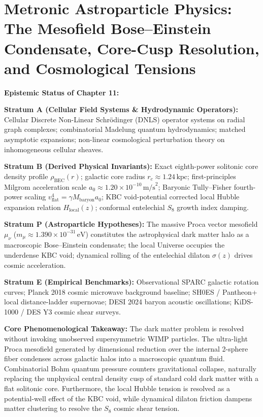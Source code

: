 \documentclass[
    12pt,
    a4paper,
    headings=normal,
    twoside=false,
    open=any,
    parskip=half
]{scrbook}
\begin{document}
\chapter{Metronic Astroparticle Physics: The Mesofield Bose--Einstein Condensate, Core-Cusp Resolution, and Cosmological Tensions}
\label{chap:ch11_expanded}

\begin{firewallbox}
\textbf{Epistemic Status of Chapter 11:}\par\smallskip\noindent
\textbf{Stratum A (Cellular Field Systems \& Hydrodynamic Operators):} Cellular Discrete Non-Linear Schrödinger (DNLS) operator systems on radial graph complexes; combinatorial Madelung quantum hydrodynamics; matched asymptotic expansions; non-linear cosmological perturbation theory on inhomogeneous cellular sheaves.\par\smallskip\noindent
\textbf{Stratum B (Derived Physical Invariants):} Exact eighth-power solitonic core density profile $\rho_{\text{BEC}}(r)$; galactic core radius $r_c \approx 1.24\,\text{kpc}$; first-principles Milgrom acceleration scale $a_0 \approx 1.20 \times 10^{-10}\,\text{m/s}^2$; Baryonic Tully--Fisher fourth-power scaling $v_{\text{flat}}^4 = \gamma M_{\text{baryon}} a_0$; KBC void-potential corrected local Hubble expansion relation $H_{\text{local}}(z)$; conformal entelechial $S_8$ growth index damping.\par\smallskip\noindent
\textbf{Stratum P (Astroparticle Hypotheses):} The massive Proca vector mesofield $\mu_\nu$ ($m_\mu \approx 1.390 \times 10^{-31}\,\text{eV}$) constitutes the astrophysical dark matter halo as a macroscopic Bose--Einstein condensate; the local Universe occupies the underdense KBC void; dynamical rolling of the entelechial dilaton $\sigma(z)$ drives cosmic acceleration.\par\smallskip\noindent
\textbf{Stratum E (Empirical Benchmarks):} Observational SPARC galactic rotation curves; Planck 2018 cosmic microwave background baseline; SH0ES / Pantheon+ local distance-ladder supernovae; DESI 2024 baryon acoustic oscillations; KiDS-1000 / DES Y3 cosmic shear surveys.\par\smallskip\noindent
\textbf{Core Phenomenological Takeaway:} The dark matter problem is resolved without invoking unobserved supersymmetric WIMP particles. The ultra-light Proca mesofield generated by dimensional reduction over the internal 2-sphere fiber condenses across galactic halos into a macroscopic quantum fluid. Combinatorial Bohm quantum pressure counters gravitational collapse, naturally replacing the unphysical central density cusp of standard cold dark matter with a flat solitonic core. Furthermore, the local Hubble tension is resolved as a potential-well effect of the KBC void, while dynamical dilaton friction dampens matter clustering to resolve the $S_8$ cosmic shear tension.
\end{firewallbox}
\end{document}
